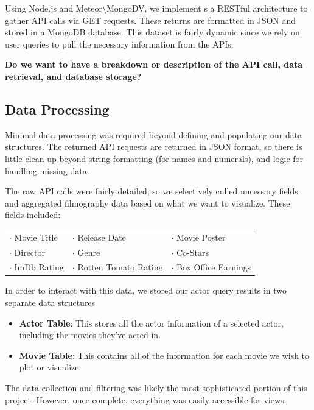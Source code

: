 \documentclass[12pt]{article}
\begin{document}
	Using Node.js and Meteor\textbackslash MongoDV, we implement s a RESTful architecture to gather API calls via GET requests. These returns are formatted in JSON and stored in a MongoDB database. This dataset is fairly dynamic since we rely on user queries to pull the necessary information from the APIs.

	
	\begin{center}
	\color{blue}
	\textbf{Do we want to have a breakdown or description of the API call, data retrieval, and database storage? }
	\end{center}
	
\subsection{Data Processing}
	Minimal data processing was required beyond defining and populating our data structures.  The returned API requests are returned in JSON format, so there is little clean-up beyond string formatting (for names and numerals), and logic for handling missing data.  
	
	The raw API calls were fairly detailed, so we selectively culled uncessary fields and aggregated filmography data based on what we want to visualize. These fields included:
	
	\begin{center}
	\begin{tabular}{lll}
	$\cdot$ Movie Title & $\cdot$ Release Date & $\cdot$ Movie Poster\\
	$\cdot$ Director  & $\cdot$ Genre & $\cdot$ Co-Stars\\
	$\cdot$ ImDb Rating & $\cdot$ Rotten Tomato Rating & $\cdot$ Box Office Earnings\\
	\end{tabular}
	\end{center}
	
	In order to interact with this data, we stored our actor query results in two separate data structures
	\begin{itemize}
		\item \textbf{Actor Table}: This stores all the actor information of a selected actor, including the movies they've acted in.
		\item \textbf{Movie Table}: This contains all of the information for each movie we wish to plot or visualize.
	\end{itemize}

	The data collection and filtering was likely the most sophisticated portion of this project. However, once complete, everything was easily accessible for views.  
	
\end{document}
